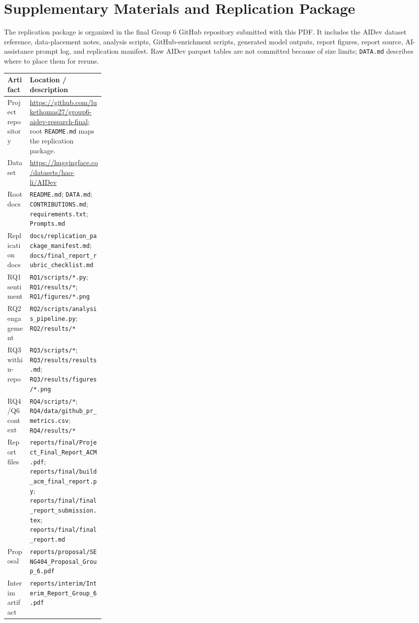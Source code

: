 \documentclass[sigconf,nonacm]{acmart}
\begin{document}
\FloatBarrier
\appendix

\section{Supplementary Materials and Replication Package}

The replication package is organized in the final Group 6 GitHub repository submitted with this PDF. It includes the AIDev dataset reference, data-placement notes, analysis scripts, GitHub-enrichment scripts, generated model outputs, report figures, report source, AI-assistance prompt log, and replication manifest. Raw AIDev parquet tables are not committed because of size limits; \texttt{DATA.md} describes where to place them for reruns.

\begin{center}
\small
\begin{tabularx}{\linewidth}{>{\raggedright\arraybackslash}p{0.23\linewidth}X}
\toprule
Artifact & Location / description \\
\midrule
Project repository & \url{https://github.com/lukethomas27/group6-aidev-research-final}; root \texttt{README.md} maps the replication package. \\
Dataset & \url{https://huggingface.co/datasets/hao-li/AIDev} \\
Root docs & \texttt{README.md}; \texttt{DATA.md}; \texttt{CONTRIBUTIONS.md}; \texttt{requirements.txt}; \texttt{Prompts.md} \\
Replication docs & \texttt{docs/replication\_package\_manifest.md}; \texttt{docs/final\_report\_rubric\_checklist.md} \\
RQ1 sentiment & \texttt{RQ1/scripts/*.py}; \texttt{RQ1/results/*}; \texttt{RQ1/figures/*.png} \\
RQ2 engagement & \texttt{RQ2/scripts/analysis\_pipeline.py}; \texttt{RQ2/results/*} \\
RQ3 within-repo & \texttt{RQ3/scripts/*}; \texttt{RQ3/results/results.md}; \texttt{RQ3/results/figures/*.png} \\
RQ4/Q6 context & \texttt{RQ4/scripts/*}; \texttt{RQ4/data/github\_pr\_metrics.csv}; \texttt{RQ4/results/*} \\
Report files & \texttt{reports/final/Project\_Final\_Report\_ACM.pdf}; \texttt{reports/final/build\_acm\_final\_report.py}; \texttt{reports/final/final\_report\_submission.tex}; \texttt{reports/final/final\_report.md} \\
Proposal & \texttt{reports/proposal/SENG404\_Proposal\_Group\_6.pdf} \\
Interim artifact & \texttt{reports/interim/Interim\_Report\_Group\_6.pdf} \\
\bottomrule
\end{tabularx}
\end{center}
\end{document}
